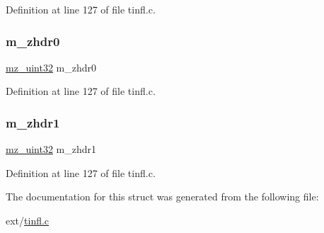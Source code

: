 Definition at line 127 of file tinfl.\+c.

\mbox{\label{structtinfl__decompressor__tag_a79053ee3b4b44065d3528b07f83c1742}} 
\subsubsection{\texorpdfstring{m\_zhdr0}{m\_zhdr0}}
{\footnotesize\ttfamily \mbox{\hyperlink{tinfl_8c_ab1a91818a39ac203d5d9f12a003e8557}{mz\+\_\+uint32}} m\+\_\+zhdr0}



Definition at line 127 of file tinfl.\+c.

\mbox{\label{structtinfl__decompressor__tag_aae1a31a75908924bbd96f1f50c2803c0}} 
\subsubsection{\texorpdfstring{m\_zhdr1}{m\_zhdr1}}
{\footnotesize\ttfamily \mbox{\hyperlink{tinfl_8c_ab1a91818a39ac203d5d9f12a003e8557}{mz\+\_\+uint32}} m\+\_\+zhdr1}



Definition at line 127 of file tinfl.\+c.



The documentation for this struct was generated from the following file\+:\begin{DoxyCompactItemize}
\item 
ext/\mbox{\hyperlink{tinfl_8c}{tinfl.\+c}}\end{DoxyCompactItemize}
